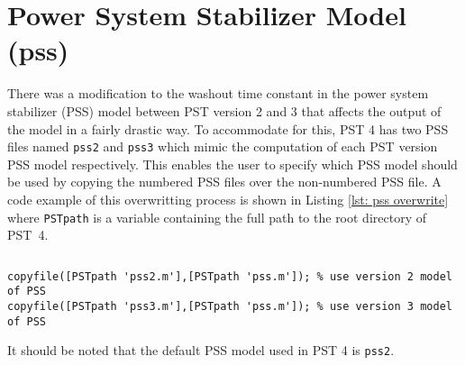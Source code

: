 \section{Power System Stabilizer Model (pss)}  
There was a modification to the washout time constant in the power system stabilizer (PSS) model between PST version 2 and 3 that affects the output of the model in a fairly drastic way.
To accommodate for this, PST 4 has two PSS files named \verb|pss2| and \verb|pss3| which mimic the computation of each PST version PSS model respectively.
This enables the user to specify which PSS model should be used by copying the numbered PSS files over the non-numbered PSS file.
A code example of this overwritting process is shown in Listing \ref{lst: pss overwrite} where \verb|PSTpath| is a variable containing the full path to the root directory of \mbox{PST 4}.


\begin{lstlisting}[caption={PSS Overwrite Example},label={lst: pss overwrite}]
\end{lstlisting}\vspace{-2 em}
\begin{verbatim}
copyfile([PSTpath 'pss2.m'],[PSTpath 'pss.m']); % use version 2 model of PSS
copyfile([PSTpath 'pss3.m'],[PSTpath 'pss.m']); % use version 3 model of PSS
\end{verbatim}

\noindent It should be noted that the default PSS model used in PST 4 is \verb|pss2|.

